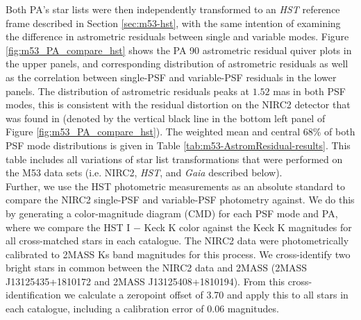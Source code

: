 \documentclass[]{spie}  %
\begin{document}
\indent Both PA's star lists were then independently transformed to an \textit{HST} reference frame described in Section \ref{sec:m53-hst}, with the same intention of examining the difference in astrometric residuals between single and variable modes. Figure \ref{fig:m53_PA_compare_hst} shows the PA 90 astrometric residual quiver plots in the upper panels, and corresponding distribution of astrometric residuals as well as the correlation between single-PSF and variable-PSF residuals in the lower panels. The distribution of astrometric residuals peaks at $1.52$ mas in both PSF modes, this is consistent with the residual distortion on the NIRC2 detector that was found in \cite{service:2016a} (denoted by the vertical black line in the bottom left panel of Figure \ref{fig:m53_PA_compare_hst}). The weighted mean and central 68\% of both PSF mode distributions is given in Table \ref{tab:m53-AstromResidual-results}. This table includes all variations of star list transformations that were performed on the M53 data sets (i.e. NIRC2, \textit{HST}, and \textit{Gaia} described below).
\\
\indent Further, we use the HST photometric measurements as an absolute standard to compare the NIRC2 single-PSF and variable-PSF photometry against. We do this by generating a color-magnitude diagram (CMD) for each PSF mode and PA, where we compare the HST I $-$ Keck K color against the Keck K magnitudes for all cross-matched stars in each catalogue. The NIRC2 data were photometrically calibrated to 2MASS Ks band magnitudes for this process. 
We cross-identify two bright stars in common between the NIRC2 data and 2MASS (2MASS J13125435+1810172 and 2MASS J13125408+1810194). From this cross-identification we calculate a zeropoint offset of 3.70 and apply this to all stars in each catalogue, including a calibration error of 0.06 magnitudes.
\\
\end{document}
